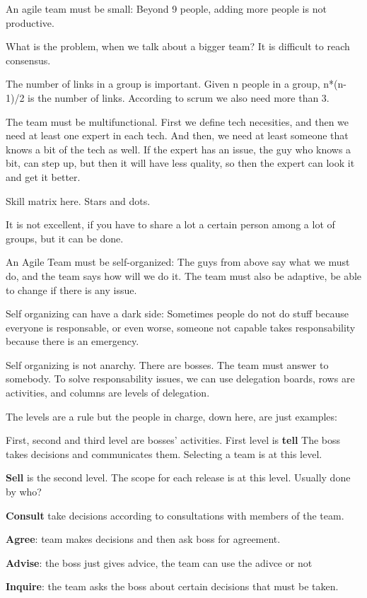 \documentclass[a4paper,12pt]{article}
\begin{document}
An agile team must be small: Beyond 9 people, adding more people is not productive.

What is the problem, when we talk about a bigger team? It is difficult to reach consensus.

The number of links in a group is important. Given n people in a group, n*(n-1)/2 is the number of links. According to scrum we also need more than 3.

The team must be multifunctional. First we define tech necesities, and then we need at least one expert in each tech. And then, we need at least someone that knows a bit of the tech as well. If the expert has an issue, the guy who knows a bit, can step up, but then it will have less quality, so then the expert can look it and get it better.

Skill matrix here. Stars and dots.

It is not excellent, if you have to share a lot a certain person among a lot of groups, but it can be done.

An Agile Team must be self-organized: The guys from above say what we must do, and the team says how will we do it. The team must also be adaptive, be able to change if there is any issue.

Self organizing can have a dark side: Sometimes people do not do stuff because everyone is responsable, or even worse, someone not capable takes responsability because there is an emergency.

Self organizing is not anarchy. There are bosses. The team must answer to somebody. To solve responsability issues, we can use delegation boards, rows are activities, and columns are levels of delegation.

The levels are a rule but the people in charge, down here, are just examples:

First, second and third level are bosses' activities. First level is \textbf{tell} The boss takes decisions and communicates them. Selecting a team is at this level.

\textbf{ Sell} is the second level. The scope for each release is at this level. Usually done by who?

\textbf{Consult} take decisions according to consultations with members of the team.

\textbf{Agree}: team makes decisions and then ask boss for agreement.

\textbf{Advise}: the boss just gives advice, the team can use the adivce or not

\textbf{Inquire}: the team asks the boss about certain decisions that must be taken.
\end{document}
